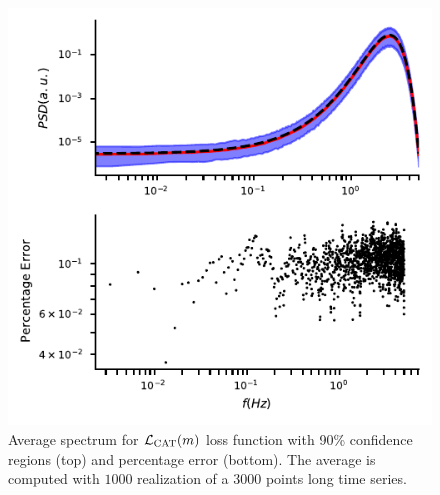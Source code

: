 \documentclass[twocolumn,showpacs,preprintnumbers,nofootinbib,prd,
superscriptaddress,10pt]{revtex4-1}
\begin{document}
\begin{figure}[t]
	\centering
	\includegraphics[width = \linewidth]{Images/optimisers_comparison/normal/CAT_spectrum_estim.pdf}
	\caption{Average spectrum for $\mathcal{L}_{\rm CAT}(m)$ loss function with 90\% confidence regions (top) and percentage error (bottom). The average is computed with $1000$ realization of a $3000$ points long time series.}
	\label{fig:CATmean}
\end{figure} 
\end{document}
